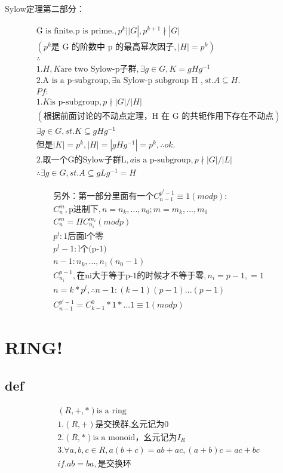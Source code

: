 \documentclass[12pt, a4paper]{article}  %
\begin{document}
Sylow定理第二部分：

\begin{align}
    &\text{G is finite.p is prime.},p^k||G|,p^{k+1}\nmid |G|\\
    &(p^k  \text {是 G 的阶数中 p 的最高幂次因子},|H|=p^k)\\
    &\therefore \\
    &1.H,K\text{are two Sylow-p子群},\exists g\in G,K=gHg^{-1}\\
    &2.\text{A is a p-subgroup},\exists\text{a Sylow-p subgroup H },st.A\subseteq H.\\
    &Pf:\\
    &1.K \text{is p-subgroup},p\nmid |G|/|H|\\
    &(\text{根据前面讨论的不动点定理，H 在 G 的共轭作用下存在不动点})\\
    &\exists g\in G,st.K\subseteq gHg^{-1}\\
    &\text{但是}|K|=p^k,|H|=|gHg^{-1}|=p^k,\therefore ok.\\
    &2.\text{取一个G的Sylow子群L},a\text{is a p-subgroup},p\nmid |G|/|L|\\
    & \therefore \exists g\in G,st. A\subseteq gLg^{-1}=H
\end{align}

\begin{align}
    &\text{另外：第一部分里面有一个}C_{n-1}^{p^l-1}\equiv 1(mod p):\\
    &C_n^m,\text{p进制下},n=n_k,...,n_0;m=m_k,...,m_0\\
    &C_n^m=\Pi C_{n_i}^{m_i}(mod p)\\
    &p^l:\text{1后面l个零}\\
    &p^l-1:\text{l个(p-1)}\\
    &n-1:n_k,...,n_1(n_0-1)\\
    &C_{n_i}^{p-1},\text{在ni大于等于p-1的时候才不等于零},n_i=p-1,=1\\
    &n=k*p^l,\therefore n-1:(k-1)(p-1)...(p-1)\\
    &C_{n-1}^{p^l-1}=C_{k-1}^0*1*...1\equiv 1(mod p)
\end{align}


\section{RING!}
\subsection{def}
\begin{align}
    &(R,+,*)\text{is a ring}\\
    &1.(R,+)\text{是交换群,幺元记为0}\\
    &2.(R,*)\text{is a monoid，幺元记为}I_R\\
    &3.\forall a,b,c\in R,a(b+c)=ab+ac,(a+b)c=ac+bc\\
    &if. ab=ba,\text{是交换环}
\end{align}
\end{document}
